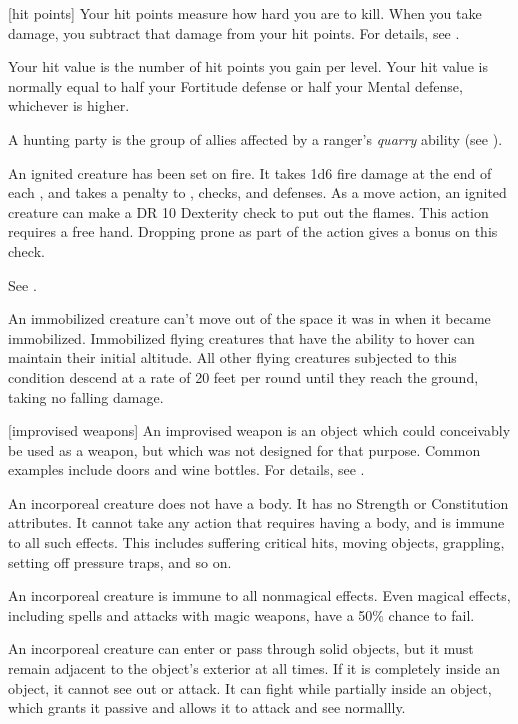 [hit points] Your hit points measure how hard you are to kill.
When you take damage, you subtract that damage from your hit points.
For details, see .

 Your hit value is the number of hit points you gain per level.
Your hit value is normally equal to half your Fortitude defense or half your Mental defense, whichever is higher.

 A hunting party is the group of allies affected by a ranger's \textit{quarry} ability (see ).

 An ignited creature has been set on fire.
It takes 1d6 fire damage at the end of each , and takes a  penalty to , checks, and defenses.
As a move action, an ignited creature can make a DR 10 Dexterity check to put out the flames.
This action requires a free hand.
Dropping prone as part of the action gives a  bonus on this check.

 See .

 An immobilized creature can't move out of the space it was in when it became immobilized. Immobilized flying creatures that have the ability to hover can maintain their initial altitude. All other flying creatures subjected to this condition descend at a rate of 20 feet per round until they reach the ground, taking no falling damage.

[improvised weapons] An improvised weapon is an object which could conceivably be used as a weapon, but which was not designed for that purpose.
Common examples include doors and wine bottles.
For details, see .

 An incorporeal creature does not have a body.
It has no Strength or Constitution attributes.
It cannot take any action that requires having a body, and is immune to all such effects.
This includes suffering critical hits, moving objects, grappling, setting off pressure traps, and so on.

An incorporeal creature is immune to all nonmagical effects.
Even magical effects, including spells and attacks with magic weapons, have a 50\% chance to fail.

An incorporeal creature can enter or pass through solid objects, but it must remain adjacent to the object's exterior at all times.
If it is completely inside an object, it cannot see out or attack.
It can fight while partially inside an object, which grants it passive  and allows it to attack and see normallly.

